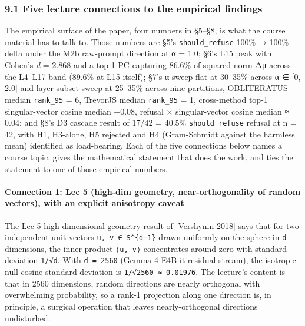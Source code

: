 \documentclass[
  11pt,
]{article}
\begin{document}
\subsubsection{9.1 Five lecture connections to the empirical
findings}\label{five-lecture-connections-to-the-empirical-findings}

The empirical surface of the paper, four numbers in §5--§8, is what the
course material has to talk to. Those numbers are §5's
\texttt{should\_refuse} 100\% → 100\% delta under the M2b raw-prompt
direction at α = 1.0; §6's L15 peak with Cohen's \emph{d} = 2.868 and a
top-1 PC capturing 86.6\% of squared-norm Δμ across the L4--L17 band
(89.6\% at L15 itself); §7's α-sweep flat at 30--35\% across α ∈ {[}0,
2.0{]} and layer-subset sweep at 25--35\% across nine partitions,
OBLITERATUS median \texttt{rank\_95} = 6, TrevorJS median
\texttt{rank\_95} = 1, cross-method top-1 singular-vector cosine median
−0.08, refusal × singular-vector cosine median ≈ 0.04; and §8's D3
cascade result of 17/42 = 40.5\% \texttt{should\_refuse} refusal at n =
42, with H1, H3-alone, H5 rejected and H4 (Gram-Schmidt against the
harmless mean) identified as load-bearing. Each of the five connections
below names a course topic, gives the mathematical statement that does
the work, and ties the statement to one of those empirical numbers.

\paragraph{Connection 1: Lec 5 (high-dim geometry, near-orthogonality of
random vectors), with an explicit anisotropy
caveat}\label{connection-1-lec-5-high-dim-geometry-near-orthogonality-of-random-vectors-with-an-explicit-anisotropy-caveat}

The Lec 5 high-dimensional geometry result of {[}Vershynin 2018{]} says
that for two independent unit vectors \texttt{u,\ v\ ∈\ S\^{}\{d−1\}}
drawn uniformly on the sphere in \texttt{d} dimensions, the inner
product \texttt{⟨u,\ v⟩} concentrates around zero with standard
deviation \texttt{1/√d}. With \texttt{d\ =\ 2560} (Gemma 4 E4B-it
residual stream), the isotropic-null cosine standard deviation is
\texttt{1/√2560\ ≈\ 0.01976}. The lecture's content is that in 2560
dimensions, random directions are nearly orthogonal with overwhelming
probability, so a rank-1 projection along one direction is, in
principle, a surgical operation that leaves nearly-orthogonal directions
undisturbed.
\end{document}
